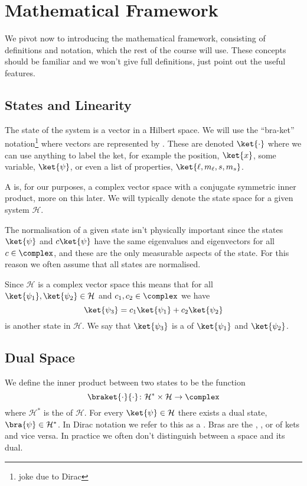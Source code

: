 \documentclass[fleqn]{NotesClass}
\newcommand*{\hilbert}{\mathcal{H}}
\begin{document}
    \section{Mathematical Framework}
    We pivot now to introducing the mathematical framework, consisting of definitions and notation, which the rest of the course will use.
    These concepts should be familiar and we won't give full definitions, just point out the useful features.
    
    \subsection{States and Linearity}
    The state of the system is a vector in a Hilbert space.
    We will use the \enquote{bra-ket} notation\footnote{joke due to Dirac} where vectors are represented by .
    These are denoted \(\ket{\cdot}\) where we can use anything to label the ket, for example the position, \(\ket{x}\), some variable, \(\ket{\psi}\), or even a list of properties, \(\ket{\ell, m_\ell, s, m_s}\).
    
    A  is, for our purposes, a complex vector space with a conjugate symmetric inner product, more on this later.
    We will typically denote the state space for a given system \(\hilbert\).
    
    The normalisation of a given state isn't physically important since the states \(\ket{\psi}\) and \(c\ket{\psi}\) have the same eigenvalues and eigenvectors for all \(c\in\complex\), and these are the only measurable aspects of the state.
    For this reason we often assume that all states are normalised.
    
    Since \(\hilbert\) is a complex vector space this means that for all \(\ket{\psi_1},\ket{\psi_2}\in\hilbert\) and \(c_1, c_2\in\complex\) we have
    \begin{equation}
        \ket{\psi_3} = c_1\ket{\psi_1} + c_2\ket{\psi_2}
    \end{equation}
    is another state in \(\hilbert\).
    We say that \(\ket{\psi_3}\) is a  of \(\ket{\psi_1}\) and \(\ket{\psi_2}\).
    
    \subsection{Dual Space}
    We define the inner product between two states to be the function
    \begin{equation}
        \braket{\cdot}{\cdot} \colon \hilbert^*\times\hilbert \to \complex
    \end{equation}
    where \(\hilbert^*\) is the  of \(\hilbert\).
    For every \(\ket{\psi}\in\hilbert\) there exists a dual state, \(\bra{\psi}\in\hilbert^*\).
    In Dirac notation we refer to this as a .
    Bras are the , , or  of kets and vice versa.
    In practice we often don't distinguish between a space and its dual.
    
\end{document}
